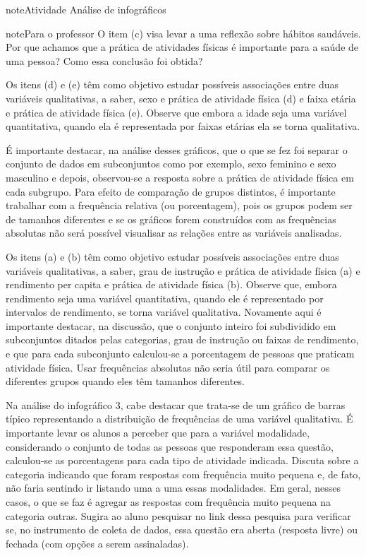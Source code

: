\begin{sphinxadmonition}{note}{Atividade}{ Análise de infográficos}
\begin{sphinxadmonition}{note}{Para o professor}
O item (c) visa levar a uma reflexão sobre hábitos saudáveis. Por que achamos que a prática de atividades físicas é importante para a saúde de uma pessoa? Como essa conclusão foi obtida?

Os itens (d) e (e) têm como objetivo estudar possíveis associações entre duas variáveis qualitativas, a saber, sexo e prática de atividade física (d) e faixa etária e prática de atividade física (e). Observe que embora a idade seja uma variável quantitativa, quando ela é representada por faixas etárias ela se torna qualitativa.

É importante destacar, na análise desses gráficos, que o que se fez foi separar o conjunto de dados em subconjuntos como por exemplo, sexo feminino e sexo masculino e depois, observou-se a resposta sobre a prática de atividade física em cada subgrupo. Para efeito de comparação de grupos distintos, é importante trabalhar com a frequência relativa (ou porcentagem), pois os grupos podem ser de tamanhos diferentes e se os gráficos forem construídos com as frequências absolutas não será possível visualisar as relações entre as variáveis analisadas.


Os itens (a) e (b) têm como objetivo estudar possíveis associações entre duas variáveis qualitativas, a saber, grau de instrução e prática de atividade física (a) e rendimento per capita e prática de atividade física (b). Observe que, embora rendimento seja uma variável quantitativa, quando ele é representado por intervalos de rendimento, se torna variável qualitativa. Novamente aqui é importante destacar, na discussão, que o conjunto inteiro foi subdividido em subconjuntos ditados pelas categorias, grau de instrução ou faixas de rendimento, e que para cada subconjunto calculou-se a porcentagem de pessoas que praticam atividade física. Usar frequências absolutas não seria útil para comparar os diferentes grupos quando eles têm tamanhos diferentes.


Na análise do infográfico 3, cabe destacar que trata-se de um gráfico de barras típico representando a distribuição de frequências de uma variável qualitativa. É importante levar os alunos a perceber que para a variável modalidade, considerando o conjunto de todas as pessoas que responderam essa questão, calculou-se as porcentagens para cada tipo de atividade indicada. Discuta sobre a categoria  indicando que foram respostas com frequência muito pequena e, de fato, não faria sentindo ir listando uma a uma essas modalidades. Em geral, nesses casos, o que se faz é agregar as respostas com frequência muito pequena na categoria outras. Sugira ao aluno pesquisar no link dessa pesquisa para verificar se, no instrumento de coleta de dados, essa questão era aberta (resposta livre) ou fechada (com opções a serem assinaladas).


\end{sphinxadmonition}
\end{sphinxadmonition}
